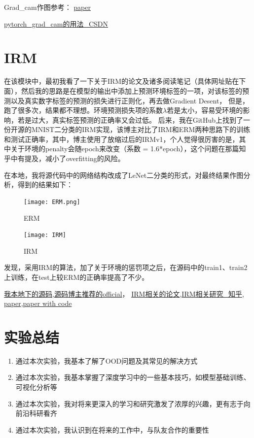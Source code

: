 \documentclass[12pt, a4paper, oneside]{ctexart}
\begin{document}
Grad\_cam作图参考：
\href{https://arxiv.org/pdf/1610.02391v1}{paper}

\href{https://blog.csdn.net/qq_24211837/article/details/134263849}{pytorch\_grad\_cam的用法\_CSDN}

\section{IRM}

在该模块中，最初我看了一下关于IRM的论文及诸多阅读笔记（具体网址贴在下面），然后我的思路是在模型的输出中添加上预测环境标签的一项，对该标签的预测以及真实数字标签的预测的损失进行正则化，再去做Gradient Desent，
但是，跑了很多次，结果都不理想。环境预测损失项的系数$\lambda$若是太小，容易受环境的影响，若是过大，真实标签预测的正确率又会过低。
后来，我在GitHub上找到了一份开源的MNIST二分类的IRM实现，该博主对比了IRM和ERM两种思路下的训练和测试正确率，其中，博主使用了放缩过后的IRMv1，个人觉得很厉害的是，其中关于环境的penalty会随epoch来改变（系数 = 1.6*epoch），这个问题在那篇知乎中有提及，减小了overfitting的风险。

在本地，我将源代码中的网络结构改成了LeNet二分类的形式，对最终结果作图分析，得到的结果如下：
\begin{figure}[H]  
    \begin{minipage}[H]{0.5\linewidth} %
            \centering
            \texttt{[image: ERM.png]}
            \caption{ERM}
     \end{minipage}
     \begin{minipage}[H]{0.5\linewidth} %
         \hspace{2mm}%
         \texttt{[image: IRM]}
         \caption{IRM}
      \end{minipage}
\end{figure}
发现，采用IRM的算法，加了关于环境的惩罚项之后，在源码中的train1、train2上训练，在test上较ERM的正确率提高了不少。

\href{https://github.com/reiinakano/invariant-risk-minimization}{我本地下的源码},\href{https://github.com/facebookresearch/InvariantRiskMinimization/tree/main}{源码博主推荐的official}，
\href{https://briefgpt.xyz/kw/invariant20risk20minimization}{IRM相关的论文},\href{https://zhuanlan.zhihu.com/p/567666715}{IRM相关研究\_知乎},
\href{https://arxiv.org/abs/1907.02893}{paper},\href{https://paperswithcode.com/paper/invariant-risk-minimization}{paper with code}

\section{实验总结}
\begin{enumerate}
    \item 通过本次实验，我基本了解了OOD问题及其常见的解决方式
    \item 通过本次实验，我基本掌握了深度学习中的一些基本技巧，如模型基础训练、可视化分析等
    \item 通过本次实验，我对将来更深入的学习和研究激发了浓厚的兴趣，更有志于向前沿科研看齐
    \item 通过本次实验，我认识到在将来的工作中，与队友合作的重要性
\end{enumerate}
\end{document}
